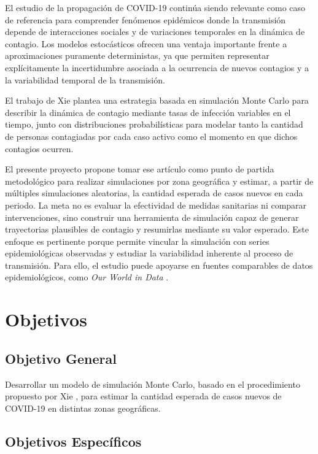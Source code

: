 \documentclass[12pt]{article}
\begin{document}
El estudio de la propagación de COVID-19 continúa siendo relevante como caso de
referencia para comprender fenómenos epidémicos donde la transmisión depende de
interacciones sociales y de variaciones temporales en la dinámica de contagio.
Los modelos estocásticos ofrecen una ventaja importante frente a aproximaciones
puramente deterministas, ya que permiten representar explícitamente la
incertidumbre asociada a la ocurrencia de nuevos contagios y a la variabilidad
temporal de la transmisión.

El trabajo de Xie \cite{Xie2020} plantea una estrategia basada en simulación
Monte Carlo para describir la dinámica de contagio mediante tasas de infección
variables en el tiempo, junto con distribuciones probabilísticas para modelar
tanto la cantidad de personas contagiadas por cada caso activo como el momento
en que dichos contagios ocurren.

El presente proyecto propone tomar ese artículo como punto de partida
metodológico para realizar simulaciones por zona geográfica y estimar, a partir
de múltiples simulaciones aleatorias, la cantidad esperada de casos nuevos en cada
periodo. La meta no es evaluar la efectividad de medidas sanitarias ni comparar
intervenciones, sino construir una herramienta de simulación capaz de generar
trayectorias plausibles de contagio y resumirlas mediante su valor esperado.
Este enfoque es pertinente porque permite vincular la simulación con series
epidemiológicas observadas y estudiar la variabilidad inherente al proceso de
transmisión. Para ello, el estudio puede apoyarse en fuentes comparables de
datos epidemiológicos, como \textit{Our World in Data}
\cite{owid-coronavirus}.

\newpage

\section{Objetivos}

\subsection{Objetivo General}

Desarrollar un modelo de simulación Monte Carlo, basado en el procedimiento
propuesto por Xie \cite{Xie2020}, para estimar la cantidad esperada de casos
nuevos de COVID-19 en distintas zonas geográficas.

\subsection{Objetivos Específicos}
\end{document}
